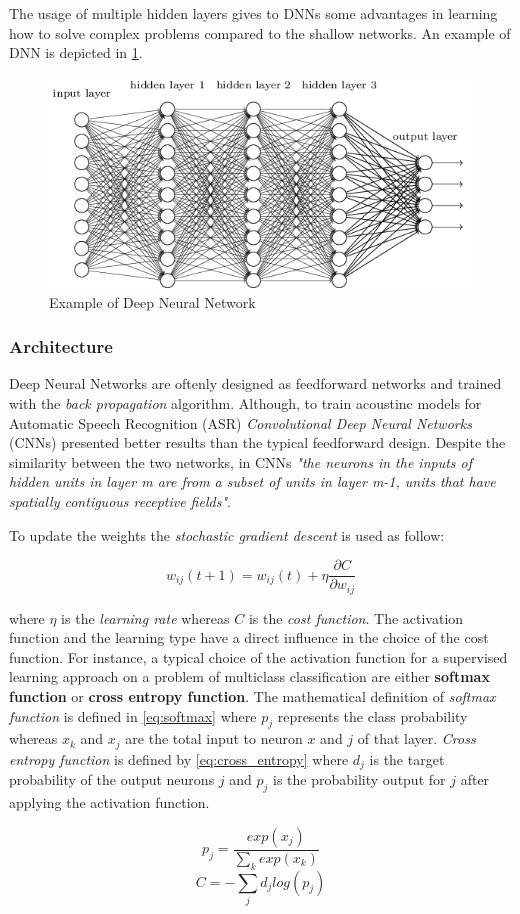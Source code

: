 \noindent The usage of multiple hidden layers gives to DNNs some advantages in learning how to solve complex problems compared to the shallow networks.\cite{dnn_website} An example of DNN is depicted in \ref{fig:deep_nn}.

\begin{figure}[!ht]
    \centering
    \includegraphics[scale=0.6]{Figures/deep_nn.png}
    \caption{Example of Deep Neural Network \cite{dnn_website}}
    \label{fig:deep_nn}
\end{figure}

\subsubsection{Architecture}
Deep Neural Networks are oftenly designed as feedforward networks and trained with the \textit{back propagation} algorithm. Although, to train acoustinc models for Automatic Speech Recognition (ASR) \textit{Convolutional Deep Neural Networks} (CNNs) presented better results than the typical feedforward design. Despite the similarity between the two networks, in CNNs \textit{"the neurons in the inputs of hidden units in layer m are from a subset of units in layer m-1, units that have spatially contiguous receptive fields"}. \cite{lenet}

\noindent To update the weights the \textit{stochastic gradient descent} is used as follow:

\begin{equation}
    w_{ij}(t+1) = w_{ij}(t) + \eta  \frac{\partial C}{\partial w_{ij}}
\end{equation}

\noindent where $\eta$ is the \textit{learning rate} whereas  $C$ is the \textit{cost function}. The activation function and the learning type have a direct influence in the choice of the cost function. For instance, a typical choice of the activation function for a supervised learning approach on a problem of multiclass classification are either \textbf{softmax function} or \textbf{cross entropy function}. The mathematical definition of \textit{softmax function} is defined in \ref{eq:softmax} where $p_{j}$ represents the class probability whereas $x_{k}$ and $x_{j}$ are the total input to neuron $x$ and $j$ of that layer. \textit{Cross entropy function} is defined by \ref{eq:cross_entropy} where $d_{j}$ is the target probability of the output neurons $j$ and $p_{j}$ is the probability output for $j$ after applying the activation function. \cite{deep_learning_wiki}

\begin{equation}\label{eq:softmax}
    p_{j} =  \frac{exp(x_{j})}{ \sum_k exp(x_{k})}
\end{equation}
\begin{equation}\label{eq:cross_entropy}
    C = -\sum_j d_{j}log(p_{j})
\end{equation}
